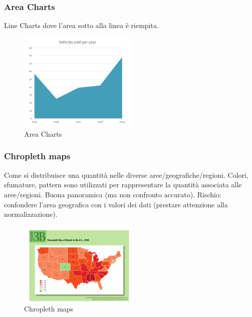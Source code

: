 \subsubsection{Area Charts}
Line Charts dove l'area sotto alla linea è riempita.
\begin{figure}[H]
    \centering
    \includegraphics[width=0.5\textwidth]{images/AreaCharts.png}
    \caption{Area Charts}
    \label{fig:immagine}
\end{figure}
\subsubsection{Chropleth maps}
Come si distribuisce una quantità nelle diverse aree/geografiche/regioni. Colori, sfumature, pattern sono utilizzati per rappresentare la quantità associata alle aree/regioni. Buona panoramica (ma non confronto accurato). Rischio: 
confondere l'area geografica con i valori dei dati (prestare attenzione alla normalizzazione).
\begin{figure}[H]
    \centering
    \includegraphics[width=0.5\textwidth]{images/Chropolet.png} 
    \caption{Chropleth maps}
    \label{fig:immagine}
\end{figure}
